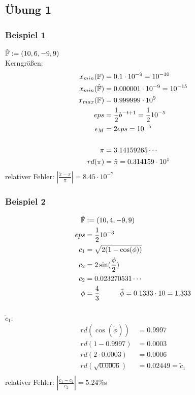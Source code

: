 \subsection{Übung 1}
\subsubsection{Beispiel 1}

$ \hat{\mathbb{F}} := (10,6,-9,9) $ \\
Kerngrößen:\\
\begin{align*}
 x_{min}(\mathbb{F}) &= 0.1 \cdot 10^{-9} = 10^{-10}\\
 x_{min}(\hat{\mathbb{F}}) &= 0.000001 \cdot 10^{-9} = 10^{-15}  \\
 x_{max}(\mathbb{F}) &= 0.999999 \cdot 10^{9}  \\
 eps &= \frac{1}{2} b^{-t + 1} = \frac{1}{2} 10^{-5}  \\
 \epsilon_{M} &= 2eps = 10^{-5}  \\
\\
 \pi &= 3.14159265\cdots  \\
 rd(\pi) &= \tilde{\pi} = 0.314159 \cdot 10^1  \\
\end{align*}
relativer Fehler: $ | \frac{\tilde{\pi} - \pi}{\pi} | = 8.45 \cdot 10^{-7} $

\subsubsection{Beispiel 2}
\begin{align*}
 \hat{\mathbb{F}} &:= (10,4,-9,9)  \\
 eps &= \frac{1}{2} 10^{-3}  \\
 c_1 &= \sqrt{2(1-\cos(\phi))}  \\
 c_2 &= 2 \sin(\frac{\phi}{2})  \\
 c_2 &= 0.023270531\cdots  \\
 \phi&= \frac{4}{3} \hspace{1cm} \tilde{\phi} = 0.1333 \cdot 10 = 1.333 \\
\end{align*}
\\
$\tilde{c}_1: $
\begin{align*}
 rd({\cos}(\tilde{\phi})) &= 0.9997  \\
 rd(1 - 0.9997) &= 0.0003  \\
 rd(2 \cdot 0.0003) &= 0.0006  \\
 rd(\sqrt{0.0006}) &= 0.02449 = \tilde{c}_1  \\
\end{align*}
relativer Fehler: $ | \frac{\tilde{c}_1 - c_2}{c_2} | = 5.24\% $s \\

